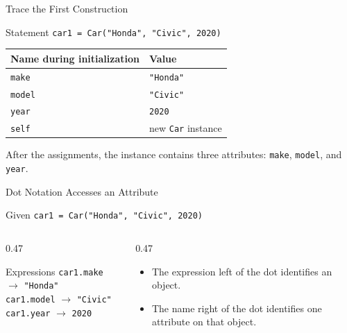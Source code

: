 \documentclass[aspectratio=169,10pt]{beamer}
\begin{document}
\begin{frame}{Trace the First Construction}
  \begin{block}{Statement}
    \texttt{car1 = Car("Honda", "Civic", 2020)}
  \end{block}

  \begin{center}
    \renewcommand{\arraystretch}{1.25}
    \begin{tabular}{l|l}
      \textbf{Name during initialization} & \textbf{Value} \\\hline
      \texttt{make} & \texttt{"Honda"} \\
      \texttt{model} & \texttt{"Civic"} \\
      \texttt{year} & \texttt{2020} \\
      \texttt{self} & new \texttt{Car} instance
    \end{tabular}
  \end{center}

  After the assignments, the instance contains three attributes: \texttt{make}, \texttt{model}, and \texttt{year}.
\end{frame}


\begin{frame}{Dot Notation Accesses an Attribute}
  \begin{block}{Given}
    \texttt{car1 = Car("Honda", "Civic", 2020)}
  \end{block}

  \begin{columns}[T,onlytextwidth]
    \begin{column}{0.47\textwidth}
      \begin{block}{Expressions}
        \texttt{car1.make} $\rightarrow$ \texttt{"Honda"}\\
        \texttt{car1.model} $\rightarrow$ \texttt{"Civic"}\\
        \texttt{car1.year} $\rightarrow$ \texttt{2020}
      \end{block}
    \end{column}
    \begin{column}{0.47\textwidth}
      \begin{itemize}
        \item The expression left of the dot identifies an object.
        \item The name right of the dot identifies one attribute on that object.
      \end{itemize}
    \end{column}
  \end{columns}
\end{frame}
\end{document}
